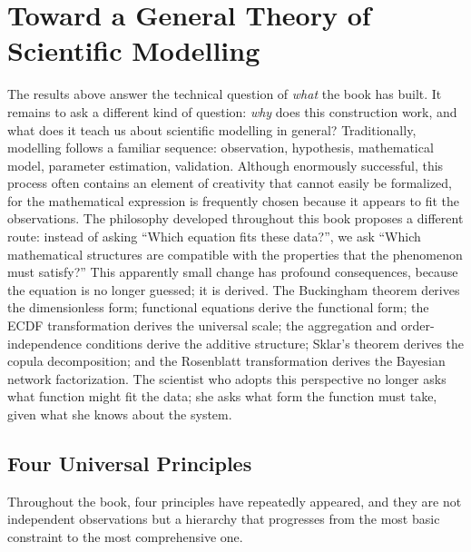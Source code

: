 \section{Toward a General Theory of Scientific Modelling}
\label{ch:manifesto}

The results above answer the technical question of \emph{what} the book has built. It remains to ask a different kind of question: \emph{why} does this construction work, and what does it teach us about scientific modelling in general? Traditionally, modelling follows a familiar sequence: observation, hypothesis, mathematical model, parameter estimation, validation. Although enormously successful, this process often contains an element of creativity that cannot easily be formalized, for the mathematical expression is frequently chosen because it appears to fit the observations. The philosophy developed throughout this book proposes a different route: instead of asking ``Which equation fits these data?'', we ask ``Which mathematical structures are compatible with the properties that the phenomenon must satisfy?'' This apparently small change has profound consequences, because the equation is no longer guessed; it is derived. The Buckingham theorem derives the dimensionless form; functional equations derive the functional form; the ECDF transformation derives the universal scale; the aggregation and order-independence conditions derive the additive structure; Sklar's theorem derives the copula decomposition; and the Rosenblatt transformation derives the Bayesian network factorization. The scientist who adopts this perspective no longer asks what function might fit the data; she asks what form the function must take, given what she knows about the system.

\subsection{Four Universal Principles}

Throughout the book, four principles have repeatedly appeared, and they are not independent observations but a hierarchy that progresses from the most basic constraint to the most comprehensive one.


